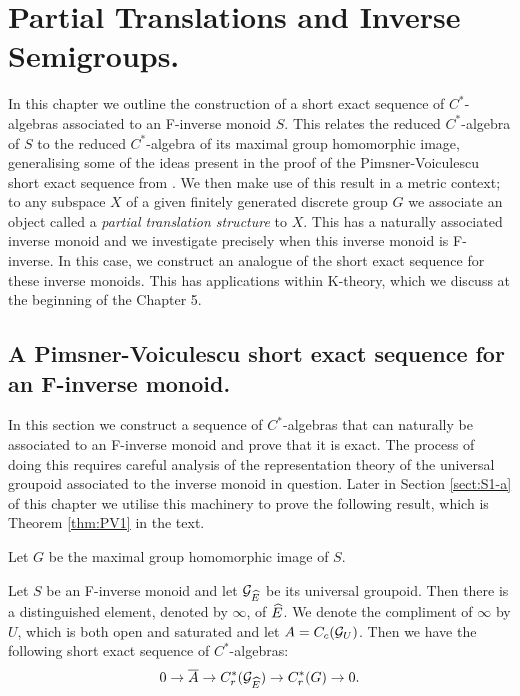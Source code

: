 \chapter{Partial Translations and Inverse Semigroups.}

In this chapter we outline the construction of a short exact sequence of $C^{*}$-algebras associated to an F-inverse monoid $S$. This relates the reduced $C^{*}$-algebra of $S$ to the reduced $C^{*}$-algebra of its maximal group homomorphic image, generalising some of the ideas present in the proof of the Pimsner-Voiculescu short exact sequence from \cite{MR670181}. We then make use of this result in a metric context; to any subspace $X$ of a given finitely generated discrete group $G$ we associate an object called a \textit{partial translation structure} to $X$. This has a naturally associated inverse monoid and we investigate precisely when this inverse monoid is F-inverse. In this case, we construct an analogue of the short exact sequence for these inverse monoids. This has applications within K-theory, which we discuss at the beginning of the Chapter 5.

\section{A Pimsner-Voiculescu short exact sequence for an F-inverse monoid.}\label{sect:S1}
In this section we construct a sequence of $C^{*}$-algebras that can naturally be associated to an F-inverse monoid and prove that it is exact. The process of doing this requires careful analysis of the representation theory of the universal groupoid associated to the inverse monoid in question. Later in Section \ref{sect:S1-a} of this chapter we utilise this machinery to prove the following result, which is Theorem \ref{thm:PV1} in the text.

Let $G$ be the maximal group homomorphic image of $S$.

\begin{thm}
Let $S$ be an F-inverse monoid and let $\mathcal{G}_{\widehat{E}}$ be its universal groupoid. Then there is a distinguished element, denoted by $\infty$, of $\widehat{E}$. We denote the compliment of $\infty$ by $U$, which is both open and saturated and let $A=C_{c}(\mathcal{G}_{U})$. Then we have the following short exact sequence of $C^{*}$-algebras:
\begin{equation*}
0 \rightarrow \overline{A} \rightarrow C^{*}_{r}(\mathcal{G}_{\widehat{E}}) \rightarrow C^{*}_{r}(G) \rightarrow 0.
\end{equation*}
\end{thm}

